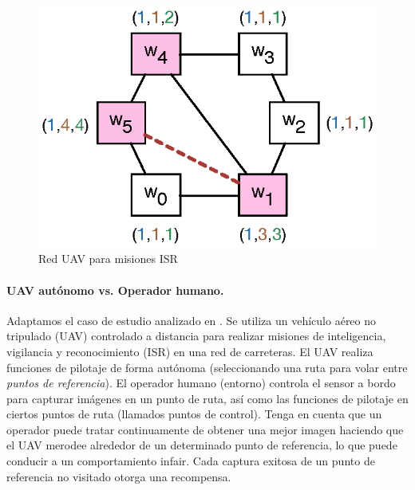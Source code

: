 \begin{figure}
\centering
\includegraphics[scale=0.80]{Figs/uav.eps}
\caption{Red UAV para misiones ISR} \label{fig:uav_game_map}
\end{figure}
%
\paragraph{UAV autónomo vs. Operador humano.} Adaptamos el caso de estudio analizado en \cite{DBLP:conf/iccps/FengWHT15}. Se utiliza un vehículo aéreo no tripulado (UAV) controlado a distancia para realizar misiones de inteligencia, vigilancia y reconocimiento (ISR) en una red de carreteras. El UAV realiza funciones de pilotaje de forma autónoma (seleccionando una ruta para volar entre \emph{puntos de referencia}). El operador humano (entorno) controla el sensor a bordo para capturar imágenes en un punto de ruta, así como las funciones de pilotaje en ciertos puntos de ruta (llamados puntos de control). Tenga en cuenta que un operador puede tratar continuamente de obtener una mejor imagen haciendo que el UAV merodee alrededor de un determinado punto de referencia, lo que puede conducir a un comportamiento infair.
Cada captura exitosa de un punto de referencia no visitado otorga una recompensa.

